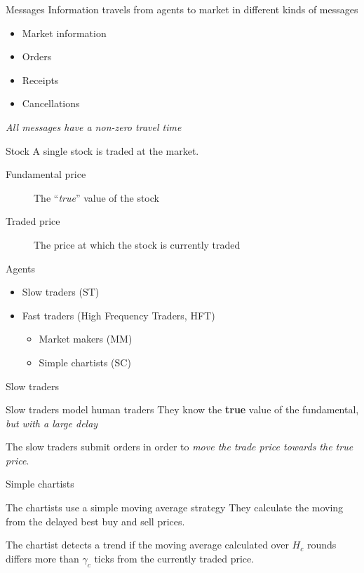 \documentclass[14pt]{beamer}
\begin{document}
\begin{frame}{Messages}
Information travels from agents to market in different kinds of messages
\begin{itemize}
\item Market information
\item Orders
\item Receipts
\item Cancellations
\end{itemize}
\textit{All messages have a non-zero travel time}
\end{frame}

\begin{frame}{Stock}
A single stock is traded at the market.
\begin{description}
\item[Fundamental price] The ``\textit{true}'' value of the stock
\item[Traded price] The price at which the stock is currently traded
\end{description}
\end{frame}


\begin{frame}{Agents}
\begin{itemize}
\item Slow traders (ST)
\item Fast traders (High Frequency Traders, HFT)
\begin{itemize}
\item Market makers (MM)
\item Simple chartists (SC)
\end{itemize}
\end{itemize}
\end{frame}



\begin{frame}{Slow traders}
\begin{block}{Slow traders model human traders}
They know the \textbf{true} value of the fundamental, \textit{but with a large delay}
\end{block}
The slow traders submit orders in order to \textit{move the trade price towards the true price}.
\end{frame}


\begin{frame}{Simple chartists}
\begin{block}{The chartists use a simple moving average strategy}
They calculate the moving from the delayed best buy and sell prices. 
\end{block}
The chartist detects a trend if the moving average calculated over $H_c$ rounds differs more than $\gamma_c$ ticks from the currently traded price.
\end{frame}
\end{document}

